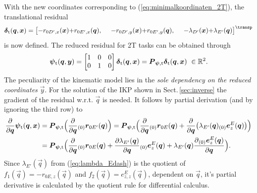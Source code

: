 \documentclass[graybox,vecphys]{svmult}
\newcommand{\Res}[0]{\vec{\delta}}
\newcommand{\ResR}[0]{\vec{\psi}}
\begin{document}
With the new coordinates corresponding to (\ref{eq:minimalkoordinaten_2T}), the translational residual 
%
\vspace{-0.1cm}
\begin{equation}
\label{eq:Phit}
\Res_\mathrm{t}(\vec{q},\vec{x})
=
\begin{bmatrix}
{-}r_{0D',x}(\vec{x}) {+} r_{0E',x}(\vec{q}) ,\enspace &
{-}r_{0D',y}(\vec{x}) {+}r_{0E',y}(\vec{q}) ,\enspace &
{-} {\lambda_{D'}(\vec{x})} {+} {\lambda_{E'}(\vec{q})}
\end{bmatrix}^\transp
\vspace{-0.1cm}
\end{equation}
%
is now defined.
The reduced residual for 2T tasks can be obtained through
%
\vspace{-0.1cm}
\begin{equation}
\label{eq:Psit_2T}
\ResR_\mathrm{t}(\vec{q},\vec{y}) = 
\begin{bmatrix}
    1 & 0 & 0  \\ 
    0 & 1 & 0
\end{bmatrix}
 \Res_\mathrm{t}(\vec{q},\vec{x})
 =\vec{P}_{\ResR,\mathrm{t}} \Res_\mathrm{t}(\vec{q},\vec{x})
 ~\in {\mathbb{R}^2}.
 \vspace{-0.1cm}
\end{equation} 
%
The peculiarity of the kinematic model lies in the \emph{sole dependency on the reduced coordinates} $\vec{y}$.
For the solution of the IKP shown in Sect.\,\ref{sec:inverse} the gradient of the residual w.r.t. $\vec{q}$ is needed.
It follows by partial derivation (and by ignoring the third row) to
%
\vspace{-0.1cm}
\begin{align}
{\frac{\partial}{\partial\vec{q}}\ResR_\mathrm{t}}(\vec{q},\vec{x}) 
&= 
\vec{P}_{\ResR,\mathrm{t}} {\Big(\frac{\partial}{\partial\vec{q}}{_{(0)}\vec{r}_{0E'}(\vec{q})}\Big)}
= \vec{P}_{\ResR,\mathrm{t}}
{\Big(\frac{\partial}{\partial\vec{q}}{_{(0)}\vec{r}_{0E}(\vec{q})}} + 
{\frac{\partial}{\partial\vec{q}}\big({\lambda_{E'}(\vec{q})}{_{(0)}\vec{e}_{z}^E}(\vec{q})\big)\Big)} \nonumber \\
&= 
\vec{P}_{\ResR,\mathrm{t}}
{\Big(\frac{\partial}{\partial\vec{q}}{_{(0)}\vec{r}_{0E}(\vec{q})}} + 
{\frac{\partial{\lambda_{E'}(\vec{q})}}{\partial\vec{q}}}{_{(0)}\vec{e}_{z}^E}(\vec{q}) +
{{\lambda_{E'}(\vec{q})}\frac{\partial{_{(0)}\vec{e}_{z}^E}(\vec{q})}{\partial\vec{q}}\Big)}.
\label{eq:Phi_grad_2T2R_2}
\vspace{-0.1cm}
\end{align}
%
Since ${\lambda_{E'}(\vec{q})}$ from (\ref{eq:lambda_Edash}) is the quotient of  ${f_\mathrm{1}(\vec{q})} = {-{r_{0E,z}(\vec{q})}}$ and ${f_\mathrm{2}(\vec{q})} = {e_{z,z}^E(\vec{q})}$, dependent on $\vec{q}$, it's partial derivative is calculated by the quotient rule for differential calculus.
\end{document}
